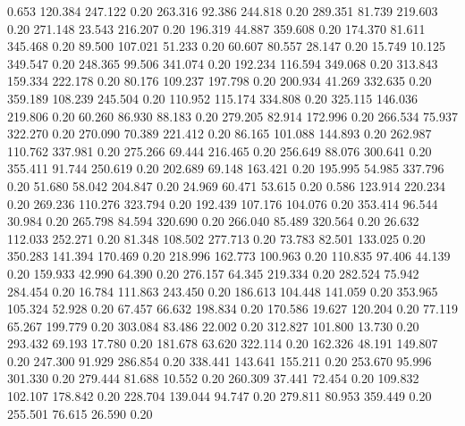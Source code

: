    0.653  120.384  247.122         0.20
 263.316   92.386  244.818         0.20
 289.351   81.739  219.603         0.20
 271.148   23.543  216.207         0.20
 196.319   44.887  359.608         0.20
 174.370   81.611  345.468         0.20
  89.500  107.021   51.233         0.20
  60.607   80.557   28.147         0.20
  15.749   10.125  349.547         0.20
 248.365   99.506  341.074         0.20
 192.234  116.594  349.068         0.20
 313.843  159.334  222.178         0.20
  80.176  109.237  197.798         0.20
 200.934   41.269  332.635         0.20
 359.189  108.239  245.504         0.20
 110.952  115.174  334.808         0.20
 325.115  146.036  219.806         0.20
  60.260   86.930   88.183         0.20
 279.205   82.914  172.996         0.20
 266.534   75.937  322.270         0.20
 270.090   70.389  221.412         0.20
  86.165  101.088  144.893         0.20
 262.987  110.762  337.981         0.20
 275.266   69.444  216.465         0.20
 256.649   88.076  300.641         0.20
 355.411   91.744  250.619         0.20
 202.689   69.148  163.421         0.20
 195.995   54.985  337.796         0.20
  51.680   58.042  204.847         0.20
  24.969   60.471   53.615         0.20
   0.586  123.914  220.234         0.20
 269.236  110.276  323.794         0.20
 192.439  107.176  104.076         0.20
 353.414   96.544   30.984         0.20
 265.798   84.594  320.690         0.20
 266.040   85.489  320.564         0.20
  26.632  112.033  252.271         0.20
  81.348  108.502  277.713         0.20
  73.783   82.501  133.025         0.20
 350.283  141.394  170.469         0.20
 218.996  162.773  100.963         0.20
 110.835   97.406   44.139         0.20
 159.933   42.990   64.390         0.20
 276.157   64.345  219.334         0.20
 282.524   75.942  284.454         0.20
  16.784  111.863  243.450         0.20
 186.613  104.448  141.059         0.20
 353.965  105.324   52.928         0.20
  67.457   66.632  198.834         0.20
 170.586   19.627  120.204         0.20
  77.119   65.267  199.779         0.20
 303.084   83.486   22.002         0.20
 312.827  101.800   13.730         0.20
 293.432   69.193   17.780         0.20
 181.678   63.620  322.114         0.20
 162.326   48.191  149.807         0.20
 247.300   91.929  286.854         0.20
 338.441  143.641  155.211         0.20
 253.670   95.996  301.330         0.20
 279.444   81.688   10.552         0.20
 260.309   37.441   72.454         0.20
 109.832  102.107  178.842         0.20
 228.704  139.044   94.747         0.20
 279.811   80.953  359.449         0.20
 255.501   76.615   26.590         0.20
